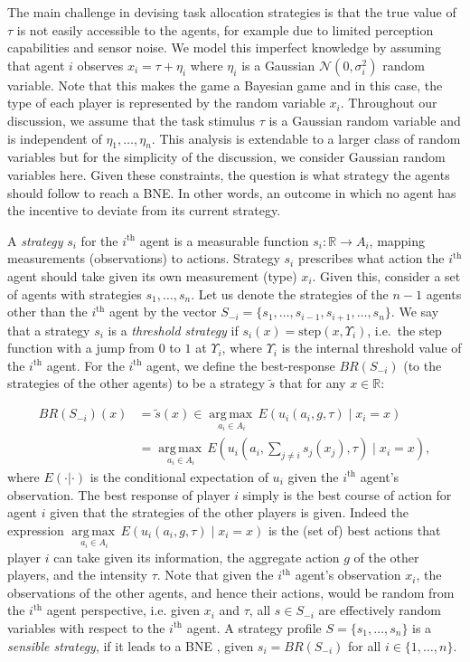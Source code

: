 \documentclass[12pt]{book}
\DeclareMathOperator*{\argmaxop}{arg\,max\,}
\newcommand{\argmax}[1]{\underset{#1}{\argmaxop}}
\newcommand{\R}{\mathbb{R}}    %
\newcommand{\td}{\Upsilon}   %
\begin{document}
The main challenge in devising task allocation strategies is that the true value of $\tau$ is not easily accessible to the agents, for example due to limited perception capabilities and sensor noise.
We model this imperfect knowledge by assuming that agent $i$ observes $x_i=\tau+\eta_i$ where $\eta_i$ is a Gaussian $\mathcal{N}(0,\sigma_i^2)$ random variable. Note that this makes the game a Bayesian game and in this case, the type of each player is represented by the random variable $x_i$. Throughout our discussion, we assume that the task stimulus $\tau$ is a Gaussian random variable and is independent of $\eta_1,\ldots,\eta_n$. This analysis is extendable to a larger class of random variables but for the simplicity of the discussion, we consider Gaussian random variables here. Given these constraints, the question is what strategy the agents should follow to reach a BNE. In other words, an outcome in which no agent has the incentive to deviate from its current strategy.

A \emph{strategy} $s_i$ for the $i^{\text{th}}$ agent is a measurable function $s_i:\R\to A_i$, mapping measurements (observations) to actions. Strategy $s_i$ prescribes what action the $i^{\text{th}}$ agent should take given its own measurement (type) $x_i$. Given this, consider a set of agents with strategies $s_1,\ldots,s_n$. Let us denote the strategies of the $n-1$ agents other than the $i^{\text{th}}$ agent by the vector $S_{-i}=\{s_1,\ldots,s_{i-1},s_{i+1},\ldots,s_n\}$.  We say that a strategy $s_i$ is a \emph{threshold strategy} if $s_i(x)=\text{step}(x, \td_i)$, i.e.\ the step function with a jump from $0$ to $1$ at $\td_i$, where $\td_i$ is the internal threshold value of the $i^{\text{th}}$ agent. For the $i^{\text{th}}$ agent, we define the best-response $BR(S_{-i})$ (to the strategies of the other agents) to be a strategy $\tilde{s}$ that for any $x\in \R$:

\begin{align}\label{eqn:BR}
BR(S_{-i})(x)&=\tilde{s}(x)\in\argmax{a_i\in A_i} E(u_i(a_i,g,\tau)\mid x_i=x)\\
&=\argmax{a_i\in A_i} E(u_i(a_i,\sum_{j\not=i}s_j(x_j),\tau)\mid x_i=x),
\end{align}
where $E(\cdot|\cdot)$ is the conditional expectation of $u_i$ given the $i^{\text{th}}$ agent's observation. The best response of player $i$ simply is the best course of action for agent $i$ given that the strategies of the other players is given. Indeed the expression $\argmax{a_i\in A_i} E(u_i(a_i,g,\tau)\mid x_i=x)$ is the (set of) best actions that player $i$ can take given its information, the aggregate action $g$ of the other players, and the intensity $\tau$. Note that given the $i^{\text{th}}$ agent's observation $x_i$, the observations of the other agents, and hence their actions, would be random from the $i^{\text{th}}$ agent perspective, i.e. given $x_i$ and $\tau$, all $s \in S_{-i}$ are effectively random variables with respect to the $i^{\text{th}}$ agent. A strategy profile $S=\{s_1,\ldots,s_n\}$ is a \emph{sensible strategy}, if it leads to a BNE \cite{Fudenberg1998}, given $s_i=BR(S_{-i})$ for all $i\in \{1,\ldots,n\}$. 
\end{document}
